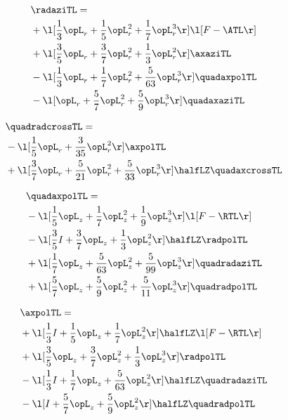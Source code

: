 \begin{alignat}{2} 
\label{eq:linradaziTL_0} 
& \radaziTL = \\ 
& + \l[ \frac{1}{3} \opL_r + \frac{1}{5} \opL_r^{2} + \frac{1}{7} \opL_r^{3}  \r] \l[ F - \ATL \r] \nonumber \\ 
& + \l[ \frac{3}{5} \opL_r + \frac{3}{7} \opL_r^{2} + \frac{1}{3} \opL_r^{2}  \r] \axaziTL \nonumber \\ 
& - \l[ \frac{1}{3} \opL_r + \frac{1}{7} \opL_r^{2} + \frac{5}{63} \opL_r^{3}  \r] \quadaxpolTL \nonumber \\ 
& - \l[ \opL_r + \frac{5}{7} \opL_r^{2} + \frac{5}{9} \opL_r^{3}  \r] \quadaxaziTL \nonumber \\ 
\end{alignat} 


\begin{alignat}{2} 
\label{eq:quadradcrossTL_0} 
& \quadradcrossTL = \\ 
& - \l[ \frac{1}{5} \opL_r + \frac{3}{35} \opL_r^{2}  \r] \axpolTL \nonumber \\ 
& + \l[ \frac{3}{7} \opL_r + \frac{5}{21} \opL_r^{2} + \frac{5}{33} \opL_r^{3}  \r] \halfLZ \quadaxcrossTL \nonumber \\ 
\end{alignat} 


\begin{alignat}{2} 
\label{eq:quadaxpolTL_0} 
& \quadaxpolTL = \\ 
& - \l[ \frac{1}{5} \opL_z + \frac{1}{7} \opL_z^{2} + \frac{1}{9} \opL_z^{3}  \r] \l[ F - \RTL \r] \nonumber \\ 
& - \l[ \frac{3}{5} I + \frac{3}{7} \opL_z + \frac{1}{3} \opL_z^{2}  \r] \halfLZ \radpolTL \nonumber \\ 
& + \l[ \frac{1}{7} \opL_z + \frac{5}{63} \opL_z^{2} + \frac{5}{99} \opL_z^{3}  \r] \quadradaziTL \nonumber \\ 
& + \l[ \frac{5}{7} \opL_z + \frac{5}{9} \opL_z^{2} + \frac{5}{11} \opL_z^{3}  \r] \quadradpolTL \nonumber \\ 
\end{alignat} 


\begin{alignat}{2} 
\label{eq:linaxpolTL_0} 
& \axpolTL = \\ 
& + \l[ \frac{1}{3} I + \frac{1}{5} \opL_z + \frac{1}{7} \opL_z^{2}  \r] \halfLZ \l[ F - \RTL \r] \nonumber \\ 
& + \l[ \frac{3}{5} \opL_z + \frac{3}{7} \opL_z^{2} + \frac{1}{3} \opL_z^{3}  \r] \radpolTL \nonumber \\ 
& - \l[ \frac{1}{3} I + \frac{1}{7} \opL_z + \frac{5}{63} \opL_z^{2}  \r] \halfLZ \quadradaziTL \nonumber \\ 
& - \l[ I + \frac{5}{7} \opL_z + \frac{5}{9} \opL_z^{2}  \r] \halfLZ \quadradpolTL \nonumber \\ 
\end{alignat} 


